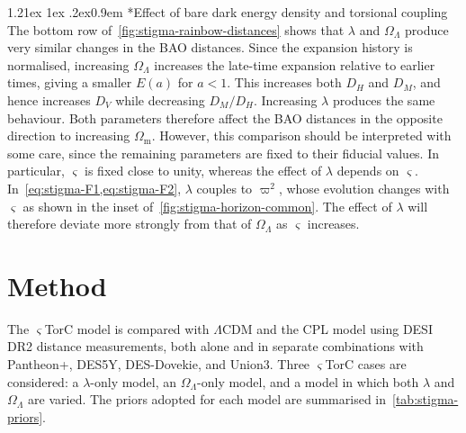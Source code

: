 \documentclass[aps,prd,reprint,preprintnumbers,showpacs,floatfix,nofootinbib,superscriptaddress]{revtex4-2}
\makeatletter
\renewcommand{\paragraph}{%
\@startsection{paragraph}{4}%
{\z@}{1.21ex \@plus 1ex \@minus .2ex}{0.9em}%
{\normalfont\normalsize\bfseries}%
}
\newcommand{\LCDM}{\ensuremath{\Lambda\mathrm{CDM}}}
\newcommand{\CLAUD}[1]{\ifmmode\text{#1}\else#1\fi}
\makeatother
\begin{document}
\paragraph*{Effect of bare dark energy density and torsional coupling} The bottom row of~\cref{fig:stigma-rainbow-distances} shows that $\lambda$ and $\Omega_\Lambda$ produce very similar changes in the BAO distances. Since the expansion history is normalised, increasing $\Omega_\Lambda$ increases the late-time expansion relative to earlier times, giving a smaller $E(a)$ for $a<1$. This increases both $D_H$ and $D_M$, and hence increases $D_V$ while decreasing $D_M/D_H$. Increasing $\lambda$ produces the same behaviour. Both parameters therefore affect the BAO distances in the opposite direction to increasing $\Omega_\mathrm{m}$. However, this comparison should be interpreted with some care, since the remaining parameters are fixed to their fiducial values. In particular, $\varsigma$ is fixed close to unity, whereas the effect of $\lambda$ depends on $\varsigma$. In~\cref{eq:stigma-F1,eq:stigma-F2}, $\lambda$ couples to $\varpi^2$, whose evolution changes with $\varsigma$ as shown in the inset of~\cref{fig:stigma-horizon-common}. The effect of $\lambda$ will therefore deviate more strongly from that of $\Omega_\Lambda$ as $\varsigma$ increases.

\section{Method}
\label{sec:stigma-method}
The $\varsigma$TorC model is compared with \LCDM{} and the CPL model using DESI DR2 distance measurements, both alone and in separate combinations with Pantheon+, DES5Y, \CLAUD{DES-Dovekie,} and Union3. Three $\varsigma$TorC cases are considered: a $\lambda$-only model, an $\Omega_\Lambda$-only model, and a model in which both $\lambda$ and $\Omega_\Lambda$ are varied. The priors adopted for each model are summarised in~\cref{tab:stigma-priors}.
\end{document}
